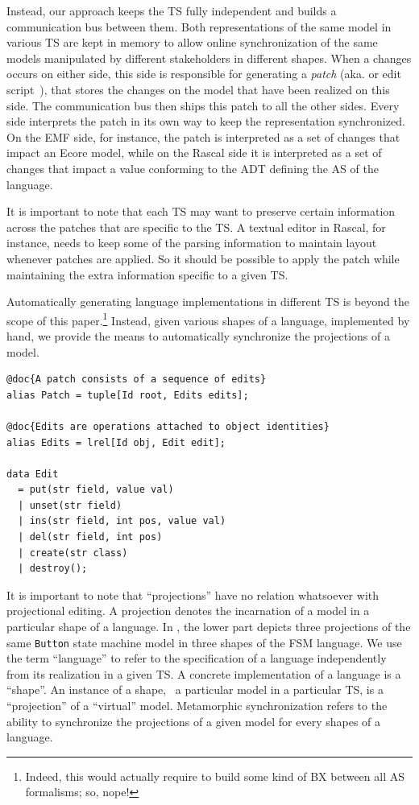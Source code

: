 \documentclass[sigplan]{acmart}
\begin{document}
Instead, our approach keeps the TS fully independent and builds a communication bus between them.
Both representations of the same model in various TS are kept in memory to allow online synchronization of the same models manipulated by different stakeholders in different shapes.
When a changes occurs on either side, this side is responsible for generating a \emph{patch} (aka. \de or edit script~\cite{rozen2017towards}), that stores the changes on the model that have been realized on this side.
The communication bus then ships this patch to all the other sides.
Every side interprets the patch in its own way to keep the representation synchronized.
On the EMF side, for instance, the patch is interpreted as a set of changes that impact an Ecore model, while on the Rascal side it is interpreted as a set of changes that impact a value conforming to the ADT defining the AS of the language.

It is important to note that each TS may want to preserve certain information across the patches that are specific to the TS.
A textual editor in Rascal, for instance, needs to keep some of the parsing information to maintain layout whenever patches are applied.
So it should be possible to apply the patch while maintaining the extra information specific to a given TS.

Automatically generating language implementations in different TS is beyond the scope of this paper.\footnote{Indeed, this would actually require to build some kind of BX between all AS formalisms; so, nope!} Instead, given various shapes of a language, implemented by hand, we provide the means to automatically synchronize the projections of a model.

\begin{lstlisting}[label=lst:delta-adt, caption={CRUD-like \ds structure definition in Rascal}, language=Rascal]
@doc{A patch consists of a sequence of edits}
alias Patch = tuple[Id root, Edits edits];

@doc{Edits are operations attached to object identities}
alias Edits = lrel[Id obj, Edit edit];

data Edit
  = put(str field, value val)
  | unset(str field)
  | ins(str field, int pos, value val)
  | del(str field, int pos)
  | create(str class) 
  | destroy();
\end{lstlisting}

It is important to note that ``projections'' have no relation whatsoever with projectional editing.
A projection denotes the incarnation of a model in a particular shape of a language.
In , the lower part depicts three projections of the same \texttt{Button} state machine model in three shapes of the FSM language.
We use the term ``language'' to refer to the specification of a language independently from its realization in a given TS.
A concrete implementation of a language is a ``shape''.
An instance of a shape, \ie~a particular model in a particular TS, is a ``projection'' of a ``virtual'' model.
Metamorphic synchronization refers to the ability to synchronize the projections of a given model for every shapes of a language.
\end{document}
